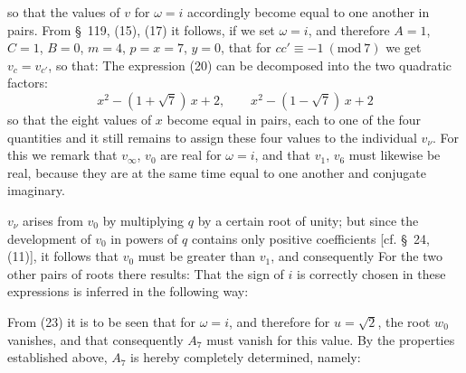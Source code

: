 so that the values of $v$ for $\omega = i$ accordingly become equal
to one another in pairs. From \S\ 119, (15), (17) it follows, if we
set $\omega = i$, and therefore $A=1$, $C=1$, $B=0$, $m=4$, $p=x=7$,
$y=0$, that for $cc' \equiv -1 \ (\mathrm{mod}\ 7)$ we get
$v_c = v_{c'}$, so that:
The expression (20) can be decomposed into the two quadratic factors:
\[
x^2 - (1+\sqrt{7})\, x + 2, \qquad x^2 - (1-\sqrt{7})\, x + 2
\]
so that the eight values of $x$ become equal in pairs, each to one of
the four quantities
and it still remains to assign these four values to the individual
$v_\nu$. For this we remark that $v_\infty$, $v_0$ are real for
$\omega = i$, and that $v_1$, $v_6$ must likewise be real, because
they are at the same time equal to one another and conjugate
imaginary.

$v_\nu$ arises from $v_0$ by multiplying $q$ by a certain root of
unity; but since the development of $v_0$ in powers of $q$ contains
only positive coefficients [cf. \S\ 24, (11)], it follows that $v_0$
must be greater than $v_1$, and consequently
For the two other pairs of roots there results:
That the sign of $i$ is correctly chosen in these expressions is
inferred in the following way:

From (23) it is to be seen that for $\omega = i$, and therefore for
$u = \sqrt{2}$, the root $w_0$ vanishes, and that consequently $A_7$
must vanish for this value. By the properties established above,
$A_7$ is hereby completely determined, namely:
